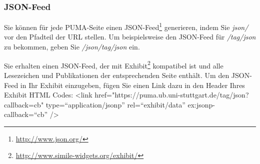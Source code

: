 \documentclass[a4paper,11pt,twoside]{scrbook}
\begin{document}
\subsubsection{JSON-Feed}
Sie können für jede PUMA-Seite einen JSON-Feed\footnote{\url{http://www.json.org/}} generieren, indem Sie \textit{json/} vor den Pfadteil der URL stellen. Um beispielsweise den JSON-Feed für \textit{/tag/json} zu bekommen, geben Sie \textit{/json/tag/json} ein.

Sie erhalten einen JSON-Feed, der mit Exhibit\footnote{\url{http://www.simile-widgets.org/exhibit/}} kompatibel ist und alle Lesezeichen und Publikationen der entsprechenden Seite enthält. Um den JSON-Feed in Ihr Exhibit einzugeben, fügen Sie einen Link dazu in den Header Ihres Exhibit HTML Codes:\newline
\newline
<link href="https://puma.ub.uni-stuttgart.de/tag/json?callback=cb" type=\enquote{application/jsonp} rel=\enquote{exhibit/data} ex:jsonp-callback=\enquote{cb} />%
\newline
\end{document}
